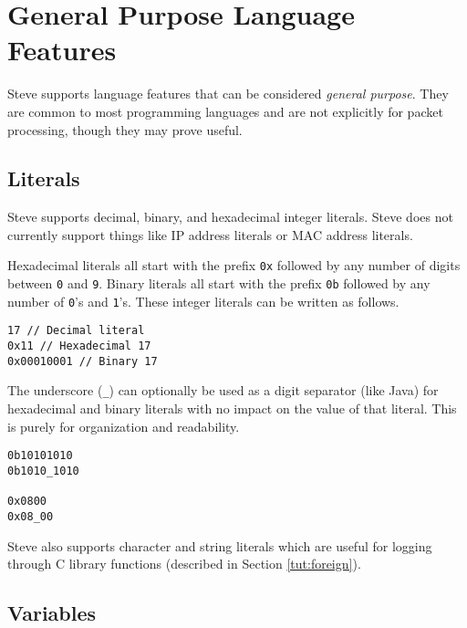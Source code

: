 \section{General Purpose Language Features} \label{tut:gen_purp}

Steve supports language features that can be considered
\textit{general purpose}. They are common to most programming
languages and are not explicitly for packet processing, though they may prove
useful.

\subsection{Literals} \label{tut:literal}

Steve supports decimal, binary, and hexadecimal integer literals. Steve does not
currently support things like IP address literals or MAC address literals.

Hexadecimal literals all start with the prefix \texttt{0x} followed by any
number of digits between \texttt{0} and \texttt{9}. Binary literals all start with the prefix \texttt{0b} followed by any number of
\texttt{0}'s and \texttt{1}'s.
These integer literals can be written as follows.

\begin{codepage}
\begin{lstlisting}
17 // Decimal literal
0x11 // Hexadecimal 17
0x00010001 // Binary 17
\end{lstlisting}
\end{codepage}
 
The underscore (\texttt{\_}) can optionally be used as a digit separator (like 
Java) for hexadecimal and binary literals with no impact on the value of that 
literal.
This is purely for organization and readability.

\begin{codepage}
\begin{lstlisting}
0b10101010
0b1010_1010

0x0800
0x08_00
\end{lstlisting}
\end{codepage}

Steve also supports character and string literals which are useful for
logging through C library functions (described in Section \ref{tut:foreign}).

\subsection{Variables} \label{tut:variable}

